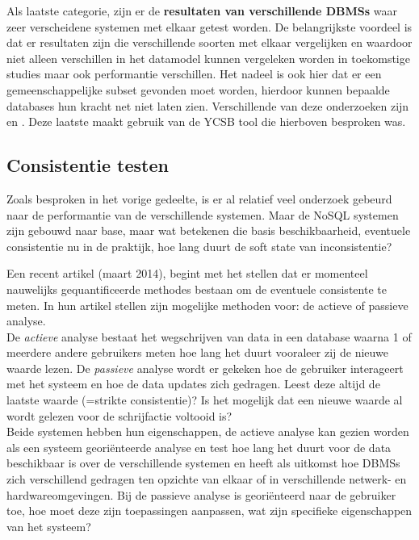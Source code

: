 Als laatste categorie, zijn er de \textbf{resultaten van verschillende \glspl{DBMS}} waar zeer verscheidene systemen met elkaar getest worden. De belangrijkste voordeel is dat er resultaten zijn die verschillende soorten met elkaar vergelijken en waardoor niet alleen verschillen in het datamodel kunnen vergeleken worden in toekomstige studies maar ook performantie verschillen. Het nadeel is ook hier dat er een gemeenschappelijke subset gevonden moet worden, hierdoor kunnen bepaalde databases hun kracht net niet laten zien. Verschillende van deze onderzoeken zijn \cite{tudorica2011comparison} en \cite{rabl2012solving}. Deze laatste maakt gebruik van de YCSB tool die hierboven besproken was. 


\subsection{Consistentie testen}
Zoals besproken in het vorige gedeelte, is er al relatief veel onderzoek gebeurd naar de performantie van de verschillende systemen. Maar de NoSQL systemen zijn gebouwd naar \gls{base}, maar wat betekenen die basis beschikbaarheid, eventuele consistentie nu in de praktijk, hoe lang duurt de soft state van inconsistentie?

Een recent artikel \cite{golab2014eventually} (maart 2014), begint met het stellen dat er momenteel nauwelijks gequantificeerde methodes bestaan om de eventuele consistente te meten. In hun artikel stellen zijn mogelijke methoden voor: de actieve of passieve analyse. \\
De \textit{actieve} analyse bestaat het wegschrijven van data in een database waarna 1 of meerdere andere gebruikers meten hoe lang het duurt vooraleer zij de nieuwe waarde lezen. 
De \textit{passieve} analyse wordt er gekeken hoe de gebruiker interageert met het systeem en hoe de data updates zich gedragen. Leest deze altijd de laatste waarde (=strikte consistentie)? Is het mogelijk dat een nieuwe waarde al wordt gelezen voor de schrijfactie voltooid is? \\
Beide systemen hebben hun eigenschappen, de actieve analyse kan gezien worden als een systeem georiënteerde analyse en test hoe lang het duurt voor de data beschikbaar is over de verschillende systemen en heeft als uitkomst hoe \glspl{DBMS} zich verschillend gedragen ten opzichte van elkaar of in verschillende netwerk- en hardwareomgevingen. 
Bij de passieve analyse is georiënteerd naar de gebruiker toe, hoe moet deze zijn toepassingen aanpassen, wat zijn specifieke eigenschappen van het systeem? 

